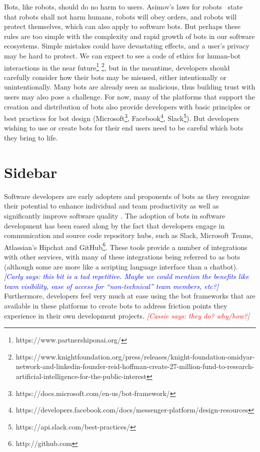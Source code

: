 \documentclass{sig-alternate}
\newcommand{\cl}[1]{\textcolor{blue}{{\it [Carly says: #1]}}}
\newcommand{\cp}[1]{\textcolor{red}{{\it [Cassie says: #1]}}}
\begin{document}
	Bots, like robots, should do no harm to users.  
	Asimov's laws for robots~\cite{asimov1950evitable} state that 
	robots shall not harm humans, robots will obey orders, and robots will protect themselves, which can also apply to software bots.
	But perhaps these rules are too simple with the complexity and rapid growth of bots in our software ecosystems.  Simple mistakes could have devastating effects, and a user's privacy may be hard to protect.  
	We can expect to see a code of ethics for human-bot interactions in the near future\footnote{https://www.partnershiponai.org/} \footnote{https://www.knightfoundation.org/press/releases/knight-foundation-omidyar-network-and-linkedin-founder-reid-hoffman-create-27-million-fund-to-research-artificial-intelligence-for-the-public-interest}, but in the meantime, developers should carefully consider how their bots may be misused, either intentionally or unintentionally. Many bots are already seen as malicious, thus building trust with users may also pose a challenge. 
	For now, many of the platforms that support the creation and distribution of bots also provide developers with basic principles or best practices for bot design (Microsoft\footnote{https://docs.microsoft.com/en-us/bot-framework/}, Facebook\footnote{https://developers.facebook.com/docs/messenger-platform/design-resources}, Slack\footnote{https://api.slack.com/best-practices/}).
	But developers wishing to use or create bots for their end users need to be careful which bots they bring to life.
	

\section*{Sidebar}

Software developers are early adopters and proponents of bots as they recognize their potential to enhance individual and team productivity as well as significantly improve software quality \cite{storey2016disrupting}. 
The adoption of bots in software development has been eased along by the fact that developers engage in communication and source code repository hubs, such as Slack, Microsoft Teams, Atlassian's Hipchat and GitHub\footnote{http://github.com}. These tools provide a number of integrations with other services, with many of these integrations being referred to as bots (although some are more like a scripting language interface than a chatbot). \cl{this bit is a tad repetitive. Maybe we could mention the benefits like team visibility, ease of access for ``non-technical'' team members, etc?}
Furthermore, developers feel very much at ease using the bot frameworks that are available in these platforms to create bots to address friction points they experience in their own development projects. \cp{they do? why/how?}
 
\end{document}
